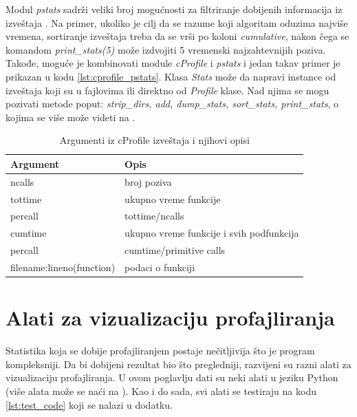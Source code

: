 \documentclass[a4paper]{article}
\begin{document}
Modul {\em pstats} sadrži veliki broj mogućnosti za filtriranje dobijenih informacija iz izveštaja \cite{cProfile}. Na primer, ukoliko je cilj da se razume koji algoritam oduzima najviše vremena, sortiranje izveštaja treba da se vrši po koloni {\em cumulative}, nakon čega se komandom {\em print\_stats(5)} može izdvojiti 5 vremenski najzahtevnijih poziva. Takođe, moguće je kombinovati module {\em cProfile} i {\em pstats} i jedan takav primer je prikazan u kodu \ref{lst:cprofile_pstats}. Klasa {\em Stats} može da napravi instance od izveštaja koji su u fajlovima ili direktno od {\em Profile} klase. Nad njima se mogu pozivati metode poput: {\em strip\_dirs, add, dump\_stats, sort\_stats, print\_stats}, o kojima se više može videti na \cite{cProfile}.
\begin{table}[h!]
\begin{center}
\caption{Argumenti iz cProfile izveštaja i njihovi opisi}
\begin{tabular}{|l|l|} \hline
\textbf{Argument} & \textbf{Opis} \\ \hline
ncalls & broj poziva\\ \hline
tottime & ukupno vreme funkcije\\ \hline
percall & tottime/ncalls\\ \hline 
cumtime & ukupno vreme funkcije i svih podfunkcija \\ \hline
percall & cumtime/primitive calls\\ \hline
filename:lineno(function) & podaci o funkciji \\ \hline
\end{tabular}
\label{tab:cProfile_args}
\end{center}
\end{table}
\section{Alati za vizualizaciju profajliranja}
Statistika koja se dobije profajliranjem postaje nečitljivija što je program kompleksniji. Da bi dobijeni rezultat bio što pregledniji, razvijeni su razni alati za vizualizaciju profajliranja. U ovom poglavlju dati su neki alati u jeziku Python (više alata može se naći na \cite{VizList}). Kao i do sada, svi alati se testiraju na kodu \ref{lst:test_code} koji se nalazi u dodatku.
    
\end{document}
